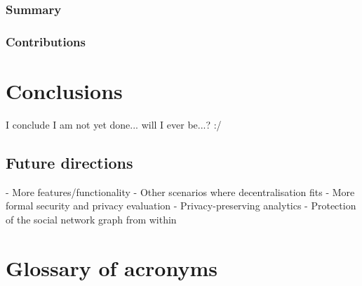 \documentclass[showtrims,oldfontcommands]{kthesis}
\begin{document}
\subsection{Summary}

\subsection{Contributions}

\renewcommand\thesection{\thechapter.\arabic{section}}
\chapter{Conclusions}
    \label{chapter:conclusions}

I conclude I am not yet done... will I ever be...? :/

\section{Future directions}
    \label{section:future-directions}
- More features/functionality
- Other scenarios where decentralisation fits
- More formal security and privacy evaluation
- Privacy-preserving analytics
- Protection of the social network graph from within


\chapter{Glossary of acronyms}
\printacronyms
\end{document}
